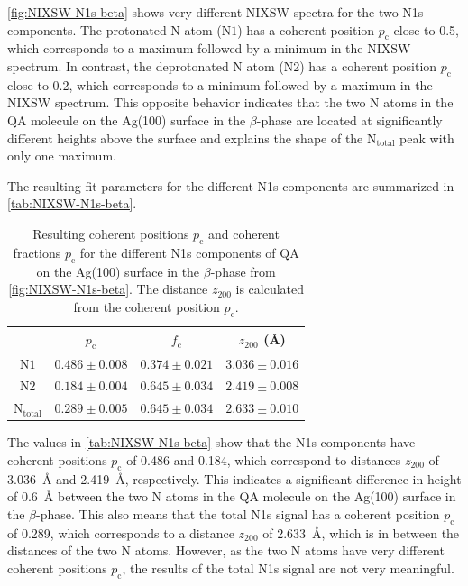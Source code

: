 \autoref{fig:NIXSW-N1s-beta} shows very different \ac{NIXSW} spectra for the two N1s components. The protonated N atom ($\mathrm{N1}$) has a coherent position $p_\mathrm{c}$ close to 0.5, which corresponds to a maximum followed by a minimum in the \ac{NIXSW} spectrum. In contrast, the deprotonated N atom ($\mathrm{N2}$) has a coherent position $p_\mathrm{c}$ close to 0.2, which corresponds to a minimum followed by a maximum in the \ac{NIXSW} spectrum. This opposite behavior indicates that the two N atoms in the \ac{QA} molecule on the Ag(100) surface in the $\beta$-phase are located at significantly different heights above the surface and explains the shape of the $\mathrm{N_{total}}$ peak with only one maximum.

The resulting fit parameters for the different N1s components are summarized in \autoref{tab:NIXSW-N1s-beta}.

\begin{table}[htbp]
	\centering
	\caption{Resulting coherent positions $p_\mathrm{c}$ and coherent fractions $p_\mathrm{c}$ for the different N1s components of \ac{QA} on the Ag(100) surface in the $\beta$-phase from \autoref{fig:NIXSW-N1s-beta}. The distance $z_{200}$ is calculated from the coherent position $p_\mathrm{c}$.}
	\begin{tabular}{@{}cccc@{}} \toprule
		 & $p_\mathrm{c}$ & $f_\mathrm{c}$ & $z_{200}$ (\si{\angstrom}) \\
		\midrule
		$\mathrm{N1}$ & $0.486 \pm 0.008$ & $0.374 \pm 0.021$ & $3.036 \pm 0.016$ \\
		$\mathrm{N2}$ & $0.184 \pm 0.004$ & $0.645 \pm 0.034$ & $2.419 \pm 0.008$ \\ 
        $\mathrm{N_{total}}$ & $0.289 \pm 0.005$ & $0.645 \pm 0.034$ & $2.633 \pm 0.010$ \\
		\bottomrule
	\end{tabular}
	\label{tab:NIXSW-N1s-beta}
\end{table}

The values in \autoref{tab:NIXSW-N1s-beta} show that the N1s components have coherent positions $p_\mathrm{c}$ of 0.486 and 0.184, which correspond to distances $z_{200}$ of 3.036~\si{\angstrom} and 2.419~\si{\angstrom}, respectively. This indicates a significant difference in height of 0.6~\si{\angstrom} between the two N atoms in the \ac{QA} molecule on the Ag(100) surface in the $\beta$-phase. This also means that the total N1s signal has a coherent position $p_\mathrm{c}$ of 0.289, which corresponds to a distance $z_{200}$ of 2.633~\si{\angstrom}, which is in between the distances of the two N atoms. However, as the two N atoms have very different coherent positions $p_\mathrm{c}$, the results of the total N1s signal are not very meaningful.

